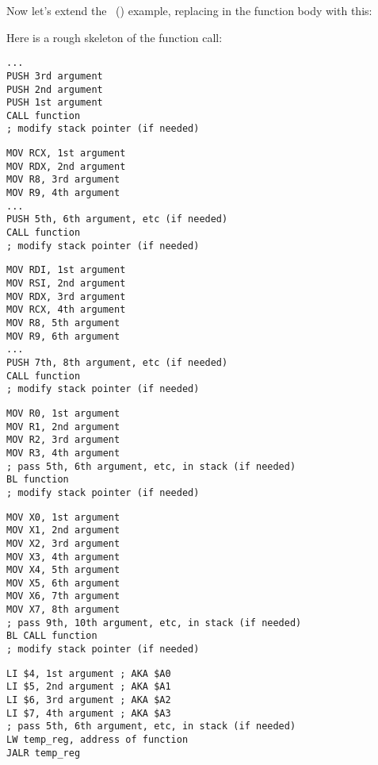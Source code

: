 \chapterold{\PrintfSeveralArgumentsSectionName}

Now let's extend the \IT{\HelloWorldSectionName}~() example, replacing \printf in
the \main function body with this:







\sectionold{\Conclusion{}}

Here is a rough skeleton of the function call:

\begin{lstlisting}[caption=x86]
...
PUSH 3rd argument
PUSH 2nd argument
PUSH 1st argument
CALL function
; modify stack pointer (if needed)
\end{lstlisting}

\begin{lstlisting}[caption=x64 (MSVC)]
MOV RCX, 1st argument
MOV RDX, 2nd argument
MOV R8, 3rd argument
MOV R9, 4th argument
...
PUSH 5th, 6th argument, etc (if needed)
CALL function
; modify stack pointer (if needed)
\end{lstlisting}

\begin{lstlisting}[caption=x64 (GCC)]
MOV RDI, 1st argument
MOV RSI, 2nd argument
MOV RDX, 3rd argument
MOV RCX, 4th argument
MOV R8, 5th argument
MOV R9, 6th argument
...
PUSH 7th, 8th argument, etc (if needed)
CALL function
; modify stack pointer (if needed)
\end{lstlisting}

\begin{lstlisting}[caption=ARM]
MOV R0, 1st argument
MOV R1, 2nd argument
MOV R2, 3rd argument
MOV R3, 4th argument
; pass 5th, 6th argument, etc, in stack (if needed)
BL function
; modify stack pointer (if needed)
\end{lstlisting}

\begin{lstlisting}[caption=ARM64]
MOV X0, 1st argument
MOV X1, 2nd argument
MOV X2, 3rd argument
MOV X3, 4th argument
MOV X4, 5th argument
MOV X5, 6th argument
MOV X6, 7th argument
MOV X7, 8th argument
; pass 9th, 10th argument, etc, in stack (if needed)
BL CALL function
; modify stack pointer (if needed)
\end{lstlisting}

\begin{lstlisting}[caption=MIPS (O32 calling convention)]
LI $4, 1st argument ; AKA $A0
LI $5, 2nd argument ; AKA $A1
LI $6, 3rd argument ; AKA $A2
LI $7, 4th argument ; AKA $A3
; pass 5th, 6th argument, etc, in stack (if needed)
LW temp_reg, address of function
JALR temp_reg
\end{lstlisting}

